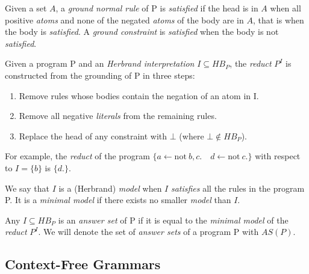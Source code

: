 \begin{definition} 
\label{def:satisfiability}
Given a set $A$, a \textit{ground normal rule} of P is \textit{satisfied} if the head is in $A$ when all positive \textit{atoms} and none of the negated \textit{atoms} of the body are in $A$, that is when the body is \textit{satisfied}. A \textit{ground constraint} is \textit{satisfied} when the body is not \textit{satisfied}.
\end{definition}

\begin{definition}
Given a program P and an \textit{Herbrand interpretation} $I \subseteq HB_P$, the \textit{reduct} $P^I$ is constructed from the grounding of P in three steps:
\begin{enumerate}[nolistsep]
\item Remove rules whose bodies contain the negation of an atom in I.
\item Remove all negative \textit{literals} from the remaining rules.
\item Replace the head of any constraint with $\bot$ (where $\bot \notin HB_P$).
\end{enumerate}
For example, the \textit{reduct} of the program $\{a \leftarrow \text{not}\ b, c.\quad d \leftarrow \text{not}\ c.\}$ with respect to $I=\{b\}$ is $\{d.\}$.
\end{definition}

\begin{definition}
We say that $I$ is a (Herbrand) \textit{model} when $I$ \textit{satisfies} all the rules in the program P. It is a \textit{minimal model} if there exists no smaller \textit{model} than $I$.
\end{definition}

\begin{definition}
Any $I \subseteq HB_P$ is an \textit{answer set} of P if it is equal to the \textit{minimal model}  of the \textit{reduct} $P^I$. We will denote the set of \textit{answer sets} of a program P with $AS(P)$. 
\end{definition}


\subsection{Context-Free Grammars}

